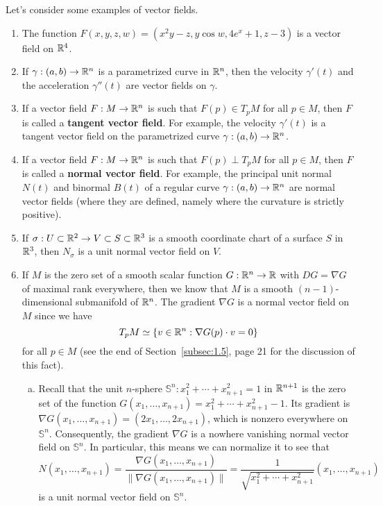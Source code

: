 Let's consider some examples of vector fields. 
\begin{enumerate}[(1)]
    \item The function $F(x, y, z, w) = (x^2y - z, y\cos w, 4e^x + 1, z - 3)$ 
    is a vector field on $\mathbb{R}^4$. 
    \item If $\gamma : (a, b) \to \mathbb{R}^n$ is a parametrized curve in $\mathbb{R}^n$, 
    then the velocity $\gamma'(t)$ and the acceleration $\gamma''(t)$ are 
    vector fields on $\gamma$. 
    \item If a vector field $F : M \to \mathbb{R}^n$ is such that $F(p) \in T_pM$ 
    for all $p \in M$, then $F$ is called a {\bf tangent vector field}. 
    For example, the velocity $\gamma'(t)$ is a tangent vector field 
    on the parametrized curve $\gamma : (a, b) \to \mathbb{R}^n$.
    \item If a vector field $F : M \to \mathbb{R}^n$ is such that $F(p) \perp T_pM$ for 
    all $p \in M$, then $F$ is called a {\bf normal vector field}. 
    For example, the principal unit normal $N(t)$ and binormal $B(t)$ 
    of a regular curve $\gamma : (a, b) \to \mathbb{R}^n$ are normal vector fields 
    (where they are defined, namely where the curvature is strictly positive).
    \item If $\sigma : U \subset \mathbb{R}^2 \to V \subset S \subset \mathbb{R}^3$ is a smooth 
    coordinate chart of a surface $S$ in $\mathbb{R}^3$, then $N_\sigma$ is a unit 
    normal vector field on $V$. 
    \item If $M$ is the zero set of a smooth scalar function $G : \mathbb{R}^n \to \mathbb{R}$ 
    with $DG = \nabla G$ of maximal rank everywhere, then we know that $M$ is a smooth 
    $(n-1)$-dimensional submanifold of $\mathbb{R}^n$. The gradient $\nabla G$ 
    is a normal vector field on $M$ since we have 
    \[ T_pM \simeq \{v \in \mathbb{R}^n : \nabla G(p) \cdot v = 0\} \] 
    for all $p \in M$ (see the end of Section~\ref{subsec:1.5}, page 21 
    for the discussion of this fact).
    \begin{enumerate}[(a)]
        \item Recall that the unit $n$-sphere $\mathbb S^n : x_1^2 + 
        \cdots + x_{n+1}^2 = 1$ in $\mathbb{R}^{n+1}$ is the zero set of the function 
        $G(x_1, \dots, x_{n+1}) = x_1^2 + \cdots + x_{n+1}^2 - 1$. Its 
        gradient is $\nabla G(x_1, \dots, x_{n+1}) = (2x_1, \dots, 2x_{n+1})$, 
        which is nonzero everywhere on $\mathbb S^n$. Consequently, the gradient 
        $\nabla G$ is a nowhere vanishing normal vector field on $\mathbb S^n$. 
        In particular, this means we can normalize it to see that 
        \[ N(x_1, \dots, x_{n+1}) = \frac{\nabla G(x_1, \dots, x_{n+1})}
        {\|\nabla G(x_1, \dots, x_{n+1})\|} = \frac{1}{\sqrt{x_1^2 + \cdots 
        + x_{n+1}^2}}(x_1, \dots, x_{n+1}) \] 
        is a unit normal vector field on $\mathbb S^n$. 


\end{enumerate}
\end{enumerate}
